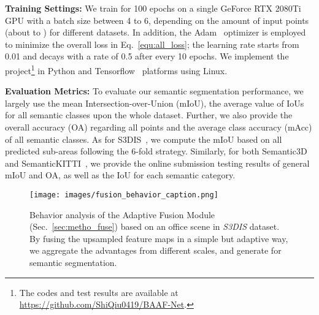 \documentclass[10pt,twocolumn,letterpaper]{article}
\begin{document}
\vspace{1mm}
\noindent \textbf{Training Settings:}
We train for 100 epochs on a single GeForce RTX 2080Ti GPU with a batch size between 4 to 6, depending on the amount of input points (about  to ) for different datasets. In addition, the Adam~\cite{kingma2014adam} optimizer is employed to minimize the overall loss in Eq.~\ref{equ:all_loss}; the learning rate starts from 0.01 and decays with a rate of 0.5 after every 10 epochs. We implement the project\footnote{The codes and test results are available at \url{https://github.com/ShiQiu0419/BAAF-Net}.} in Python and Tensorflow~\cite{abadi2016tensorflow} platforms using Linux.

\vspace{1mm}
\noindent \textbf{Evaluation Metrics:}
To evaluate our semantic segmentation performance, we largely use the mean Intersection-over-Union (mIoU), the average value of IoUs for all semantic classes upon the whole dataset. Further, we also provide the overall accuracy (OA) regarding all points and the average class accuracy (mAcc) of all semantic classes. As for S3DIS~\cite{armeni2017joint}, we compute the mIoU based on all predicted sub-areas following the 6-fold strategy. Similarly, for both Semantic3D~\cite{hackel2017semantic3d} and SemanticKITTI~\cite{behley2019semantickitti}, we provide the online submission testing results of general mIoU and OA, as well as the IoU for each semantic category.

\begin{figure*}
\begin{center}
\texttt{[image: images/fusion\_behavior\_caption.png]}
\end{center}
\vspace{-5mm}
\captionsetup{font=small}
\caption{Behavior analysis of the Adaptive Fusion Module (Sec.~\ref{sec:metho_fuse}) based on an office scene in \emph{S3DIS} dataset. By fusing the upsampled feature maps in a simple but adaptive way, we aggregate the advantages from different scales, and generate  for semantic segmentation.}
\label{fig:visual}
\vspace{-3mm}
\end{figure*}
\end{document}
